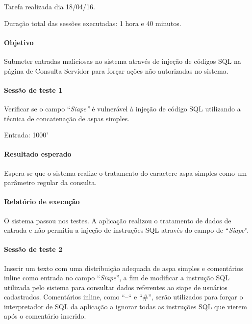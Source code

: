 \documentclass[
    12pt,               %
    openright,          %
    oneside,            %
    a4paper,            %
    section=TITLE,     %
    english,            %
    french,             %
    spanish,            %
    brazil              %
    ]{abntex2}
\begin{document}
Tarefa realizada dia 18/04/16.


Duração total das sessões executadas: 1 hora e 40 minutos.



\paragraph*{Objetivo~}

Submeter entradas maliciosas no sistema através de injeção de códigos SQL na página de Consulta Servidor para forçar ações não autorizadas no sistema.



\paragraph*{Sessão de teste 1}

Verificar se o campo \textquotedblleft{}\emph{Siape\textquotedblright{}} é vulnerável à injeção de código SQL utilizando a técnica de concatenação de aspas simples.


Entrada: 1000\rq{}



\paragraph*{Resultado esperado}

Espera-se que o sistema realize o tratamento do caractere aspa simples como um parâmetro regular da consulta.



\paragraph*{Relatório de execução}

O sistema passou nos testes. A aplicação realizou o tratamento de dados de entrada e não permitiu a injeção de instruções SQL através do campo de \textquotedblleft{}\emph{Siape}\textquotedblright{}.



\paragraph*{Sessão de teste 2}

Inserir um texto com uma distribuição adequada de aspa simples e comentários inline como entrada no campo \textquotedblleft{}\emph{Siape}\textquotedblright{}, a fim de modificar a instrução SQL utilizada pelo sistema para consultar dados referentes ao siape de usuários cadastrados. Comentários inline, como \textquotedblleft{}--\textquotedblleft{} e \textquotedblleft{}\#\textquotedblright{}, serão utilizados para forçar o interpretador de SQL da aplicação a ignorar todas as instruções SQL que vierem após o comentário inserido.
\end{document}

